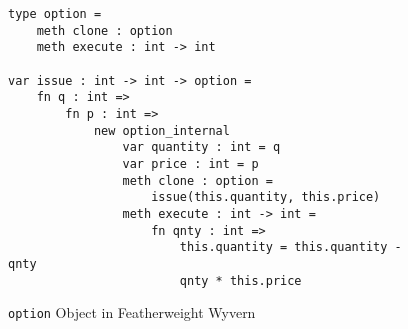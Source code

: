 \begin{figure}
  \centering
\begin{lstlisting}
type option =
	meth clone : option
	meth execute : int -> int

var issue : int -> int -> option =
	fn q : int =>
		fn p : int =>
			new option_internal
				var quantity : int = q
				var price : int = p
				meth clone : option =
					issue(this.quantity, this.price)
				meth execute : int -> int =
					fn qnty : int =>
						this.quantity = this.quantity - qnty
						qnty * this.price
\end{lstlisting}
\caption{\texttt{option} Object in Featherweight Wyvern}
\label{f-core2-example}
\end{figure}
